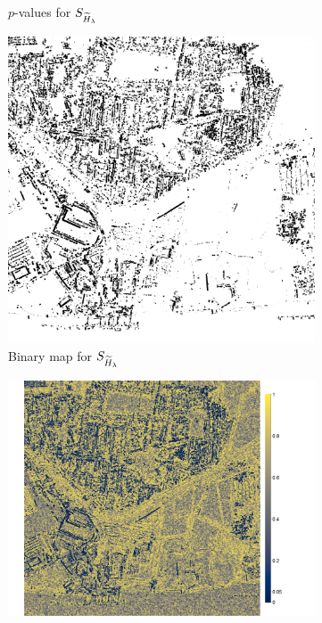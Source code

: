 \documentclass[
  journal,
]{IEEEtran}%
\begin{document}
\begin{figure}[hbt]
\begin{subfigure}{0.22\textwidth}
        \caption{ $p$-values for $\small{S_{\widetilde{H}_{\lambda}}}$}
        \label{fig:1b}
    \end{subfigure}
    \begin{subfigure}{0.17\textwidth}
        \includegraphics[width=\linewidth]{./Figures/H_005_london_renyi_L1_.png}
        \caption{Binary map for $\small{S_{\widetilde{H}_{\lambda}}}$}
        \label{fig:1c}
    \end{subfigure}
    \begin{subfigure}{0.22\textwidth}
        \includegraphics[width=\linewidth]{./Figures/H_pvalue_london_Shannon_c1.png}

\end{subfigure}
\end{figure}
\end{document}
